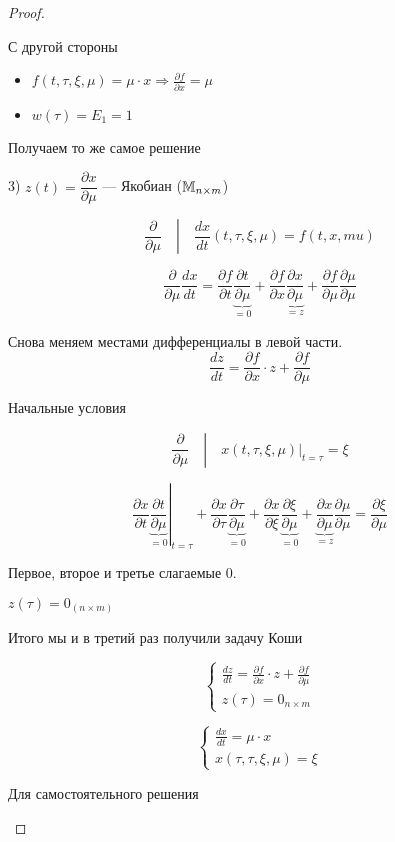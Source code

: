 \begin{proof}
\begin{example}
    С другой стороны
    \begin{itemize}
      \item $f(t, \tau, \xi, \mu) = \mu \cdot x \Rightarrow \frac{\partial f}{\partial x} = \mu$
      \item $w(\tau) = E_1 = 1$
    \end{itemize}
  
    Получаем то же самое решение
  \end{example}


  3) $z(t) =\dfrac{\partial x}{\partial \mu}$ --- Якобиан ($\mathbb{M}_{n\times m}$)

  $$\left. \frac{\partial}{\partial \mu}\quad \right| \quad \frac{dx}{dt}(t, \tau, \xi, \mu) = f(t, x,mu)$$

  $$\frac{\partial}{\partial \mu} \frac{dx}{dt} =
  \frac{\partial f}{\partial t} \underbrace{\frac{\partial t}{\partial \mu}}_{=0} +
  \frac{\partial f}{\partial x} \underbrace{\frac{\partial x}{\partial \mu}}_{=z} +
  \frac{\partial f}{\partial \mu} \frac{\partial \mu}{\partial \mu}$$

  Снова меняем местами дифференциалы в левой части.
  $$\frac{dz}{dt} = \frac{\partial f}{\partial x}\cdot z + \frac{\partial f}{\partial \mu}$$

  Начальные условия

  $$\left. \frac{\partial}{\partial \mu}\quad \right| \quad
  x(t, \tau, \xi,\mu) \big|_{t = \tau} = \xi$$
  
  $$\left.\frac{\partial x}{\partial t} \underbrace{\frac{\partial t}{\partial \mu}}_{=0} \right|_{t = \tau} +
  \frac{\partial x}{\partial \tau} \underbrace{\frac{\partial \tau}{\partial \mu}}_{=0} +
  \frac{\partial x}{\partial \xi} \underbrace{\frac{\partial \xi}{\partial \mu}}_{= 0} +
  \underbrace{\frac{\partial x}{\partial \mu}}_{=z} \frac{\partial \mu}{\partial \mu} =
  \frac{\partial \xi}{\partial \mu}$$

  Первое, второе и третье слагаемые 0.

  $z(\tau) = 0_{(n \times m)}$

  Итого мы и в третий раз получили задачу Коши

  $$
  \begin{cases}
    \frac{dz}{dt} = \frac{\partial f}{\partial x} \cdot z + \frac{\partial f}{\partial \mu} \\
    z(\tau) = 0_{n \times m}
  \end{cases}
  $$

  \begin{example}
    $$
    \begin{cases}
      \frac{dx}{dt} = \mu \cdot x \\
      x(\tau, \tau, \xi, \mu) = \xi
    \end{cases}
    $$
    
    Для самостоятельного решения
  \end{example}

\end{proof}

